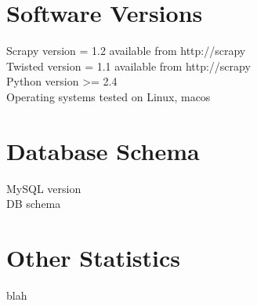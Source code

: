 \appendix
\appendixpage
\addappheadtotoc
\chapter{Software Versions}
Scrapy version = 1.2 available from http://scrapy
\\Twisted version = 1.1 available from http://scrapy
\\Python version >= 2.4 
\\Operating systems tested on Linux, macos
\chapter{Database Schema}
MySQL version
\\DB schema
\chapter{Other Statistics}
blah
